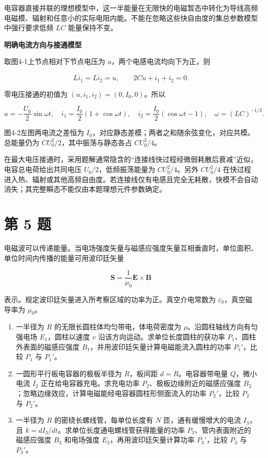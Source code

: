 \documentclass[12pt,a4paper,UTF8]{ctexart}
\newcommand{\tightlist}{\setlength{\itemsep}{0pt}\setlength{\parskip}{0pt}}
\begin{document}
电容器直接并联的理想模型中，这一半能量在无限快的电磁暂态中转化为导线高频电磁模、辐射和任意小的实际电阻内能。不能在忽略这些快自由度的集总参数模型中强行要求低频
\(LC\) 能量保持不变。

\textbf{明确电流方向与接通模型}

取图4-1上节点相对下节点电压为 \(u\)，两个电感电流均向下为正，则

\[L\dot i_1=L\dot i_2=u,\qquad2C\dot u+i_1+i_2=0.\]

零电压接通的初值为 \((u,i_1,i_2)=(0,I_0,0)\)。所以

\[u=-\frac{U_0}{2}\sin\omega t,\quad
i_1=\frac{I_0}{2}(1+\cos\omega t),\quad
i_2=\frac{I_0}{2}(\cos\omega t-1),\quad\omega=(LC)^{-1/2}.\]

图4-2左图两电流之差恒为
\(I_0\)，对应静态差模；两者之和随余弦变化，对应共模。总能量仍为
\(CU_0^2/2\)，其中振荡与静态各占 \(CU_0^2/4\)。

在最大电压接通时，采用题解通常隐含的``连接线快过程经微弱耗散后衰减''近似，电容总电荷给出共同电压
\(U_0/2\)，低频振荡能量为 \(CU_0^2/4\)。另外 \(CU_0^2/4\)
在快过程进入热、辐射或其他高频自由度。若连接线仅有电感且完全无耗散，快模不会自动消失；其完整瞬态不能仅由本题理想元件参数确定。

\newpage

\section{第 5 题}\label{ux7b2c-5-ux9898}

电磁波可以传递能量。当电场强度矢量与磁感应强度矢量互相垂直时，单位面积、单位时间内传播的能量可用波印廷矢量

\[\bm S=\frac1{\mu_0}\bm E\times\bm B\]

表示。规定波印廷矢量进入所考察区域的功率为正。真空介电常数为
\(\varepsilon_0\)，真空磁导率为 \(\mu_0\)。

\begin{enumerate}
\def\labelenumi{\arabic{enumi}.}
\tightlist
\item
  一半径为 \(R\) 的无限长圆柱体均匀带电，体电荷密度为
  \(\rho\)。沿圆柱轴线方向有匀强电场 \(E_1\)，圆柱以速度 \(v\)
  沿该方向运动。求单位长度圆柱的获功率 \(P_1\)、圆柱外表面的磁感应强度
  \(B_1\)，并用波印廷矢量计算电磁能流入圆柱的功率 \(P_1'\)，比较 \(P_1\)
  与 \(P_1'\)。
\item
  一圆形平行板电容器的极板半径为 \(R\)，板间距 \(d=R\)。电容器带电量
  \(Q\)，微小电流 \(I_2\) 正在给电容器充电。求充电功率
  \(P_2\)、极板边缘附近的磁感应强度
  \(B_2\)；忽略边缘效应，计算电磁能经电容器圆柱形侧面流入的功率
  \(P_2'\)，比较 \(P_2\) 与 \(P_2'\)。
\item
  一半径为 \(R\) 的密绕长螺线管，每单位长度有 \(N\)
  匝，通有缓慢增大的电流 \(I_3\)，且
  \(k=dI_3/dt\)。求单位长度通电螺线管获得能量的功率
  \(P_3\)、管内表面附近的磁感应强度 \(B_3\) 和电场强度
  \(E_3\)，再用波印廷矢量计算功率 \(P_3'\)，比较 \(P_3\) 与 \(P_3'\)。
\end{enumerate}
\end{document}
